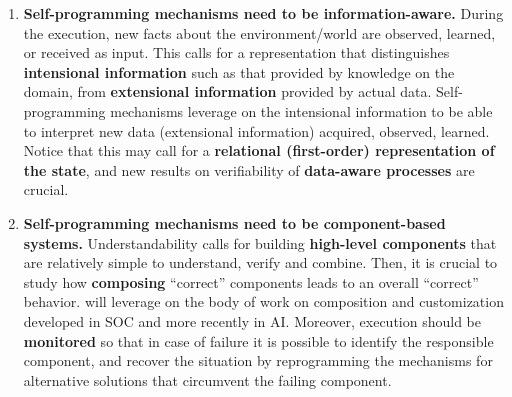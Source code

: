 \begin{enumerate}
\item \textbf{Self-programming mechanisms need to be information-aware.}
  During the execution, new facts about the environment/world are
  observed, learned, or received as input. This calls for a
  representation that distinguishes \textbf{intensional information}
  such as that provided by knowledge on the domain, from
  \textbf{extensional information} provided by actual
  data. Self-programming mechanisms leverage on the intensional
  information to be able to interpret new data (extensional
  information) acquired, observed, learned.  Notice that this may call
  for a \textbf{relational (first-order) representation of the state},
  and new results on verifiability of \textbf{data-aware processes}
  are crucial. %
\autocite[]{HullSV13}
\autocite[]{BelardinelliLP14} 
\autocite[]{DeGLP16} %

\item \textbf{Self-programming mechanisms need to be component-based
    systems.}  Understandability calls for building \textbf{high-level
    components} that are relatively simple to understand,
  verify and combine. Then, it is crucial to study how
  \textbf{composing} ``correct'' components leads to an overall
  ``correct'' behavior.
\project will leverage on the body of work on composition and customization developed in SOC and more recently in AI.
 \autocite[]{SohrabiPM09} \autocite[]{BertoliPT10} \autocite[]{DePS13} %
\autocite[]{DeGGPSS16}
Moreover, execution should be \textbf{monitored} so that in case of
failure it is possible to identify the responsible component, and
recover the situation by reprogramming the mechanisms for alternative
solutions that circumvent the failing
component. \autocite[]{DeGMGMM14} \autocite[]{MarrellaMS17}


\end{enumerate}




